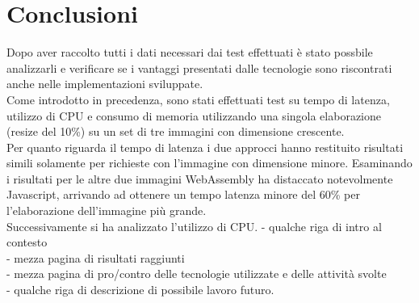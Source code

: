 \chapter*{Conclusioni}
\label{Conclusioni}
Dopo aver raccolto tutti i dati necessari dai test effettuati è stato possbile analizzarli e verificare se i vantaggi presentati dalle tecnologie sono riscontrati anche nelle implementazioni sviluppate.
\\Come introdotto in precedenza, sono stati effettuati test su tempo di latenza, utilizzo di CPU e consumo di memoria utilizzando una singola elaborazione (resize del 10\%) su un set di tre immagini con dimensione crescente.
\\Per quanto riguarda il tempo di latenza i due approcci hanno restituito risultati simili solamente per richieste con l'immagine con dimensione minore. Esaminando i risultati per le altre due immagini WebAssembly ha distaccato notevolmente Javascript, arrivando ad ottenere un tempo latenza minore del 60\% per l'elaborazione dell'immagine più grande.
\\Successivamente si ha analizzato l'utilizzo di CPU.
\bigbreak
- qualche riga di intro al contesto
\\- mezza pagina di risultati raggiunti
\\- mezza pagina di pro/contro delle tecnologie utilizzate e delle attività svolte
\\- qualche riga di descrizione di possibile lavoro futuro.
